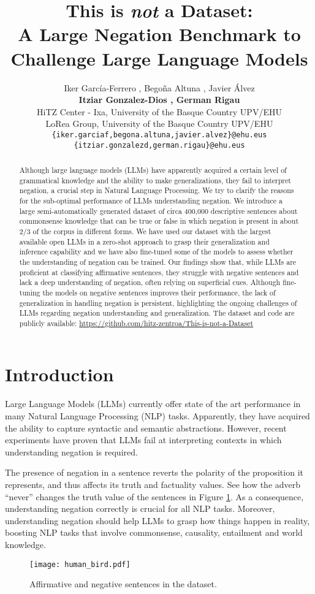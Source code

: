 \documentclass[11pt]{article}
\title{This is \textit{not} a Dataset: \\ A Large Negation Benchmark to Challenge Large Language Models}
\author{Iker García-Ferrero , Bego\~{n}a Altuna , Javier \'{A}lvez \\ \textbf{Itziar Gonzalez-Dios , German Rigau}  \\
 HiTZ Center - Ixa, University of the Basque Country UPV/EHU \\
LoRea Group, University of the Basque Country UPV/EHU \\
\texttt{\{iker.garciaf,begona.altuna,javier.alvez\}@ehu.eus} \\
  \texttt{\{itziar.gonzalezd,german.rigau\}@ehu.eus} \\
}
\begin{document}
\maketitle
\begin{abstract}

Although large language models (LLMs) have apparently acquired a certain level of grammatical knowledge and the ability to make generalizations, they fail to interpret negation, a crucial step in Natural Language Processing. We try to clarify the reasons for the sub-optimal performance of LLMs understanding negation. We introduce a large semi-automatically generated dataset of circa 400,000 descriptive sentences about commonsense knowledge that can be true or false in which negation is present in about 2/3 of the corpus in different forms. 
We have used our dataset with the largest available open LLMs in a zero-shot approach to grasp their generalization and inference capability and we have also fine-tuned some of the models to assess whether the understanding of negation can be trained. Our findings show that, while LLMs are proficient at classifying affirmative sentences, they struggle with negative sentences and lack a deep understanding of negation, often relying on superficial cues. Although fine-tuning the models on negative sentences improves their performance, the lack of generalization in handling negation is persistent, highlighting the ongoing challenges of LLMs regarding negation understanding and generalization.
The dataset and code are publicly available: \url{https://github.com/hitz-zentroa/This-is-not-a-Dataset}
\end{abstract}

\section{Introduction}

Large Language Models (LLMs) currently offer state of the art performance in many Natural Language Processing (NLP) tasks. Apparently, they have acquired the ability to capture syntactic \cite{Baroni2020} and semantic \cite{furrer2021compositional} abstractions. However, recent experiments \cite{kassner-schutze-2020-negated,hossain-etal-2020-analysis,truong2022} have proven that LLMs fail at interpreting contexts in which understanding negation is required.

The presence of negation in a sentence reverts the polarity of the proposition it represents, and thus affects its truth and factuality values. See how the adverb ``never'' changes the truth value of the sentences in Figure \ref{fig:example}. As a consequence, understanding negation correctly is crucial for all NLP tasks. Moreover, understanding negation should help LLMs to grasp how things happen in reality, boosting NLP tasks that involve commonsense, causality, entailment and world knowledge. \begin{figure}[t]
\centering
\texttt{[image: human\_bird.pdf]}
\caption{Affirmative and negative sentences in the dataset.}
\label{fig:example}
\end{figure}
\end{document}
